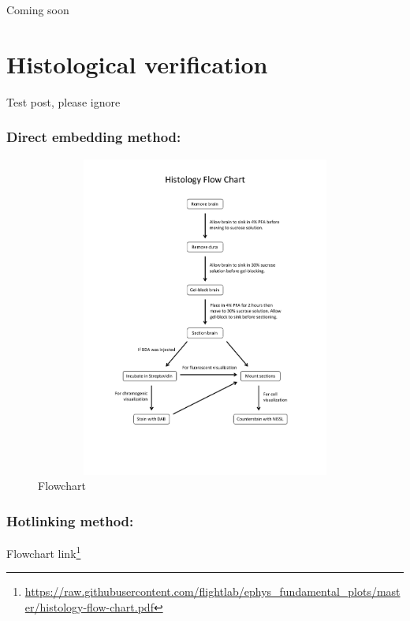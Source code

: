\documentclass[
]{book}
\DeclareRobustCommand{\href}[2]{#2\footnote{\url{#1}}}
\begin{document}
Coming soon

\hypertarget{histological-verification}{%
\chapter{Histological verification}\label{histological-verification}}

Test post, please ignore

\hypertarget{direct-embedding-method}{%
\subsection{Direct embedding method:}\label{direct-embedding-method}}

\begin{figure}
\centering
\includegraphics[width=1\textwidth,height=4.16667in]{./histology-flow-chart.pdf}
\caption{Flowchart}
\end{figure}

\hypertarget{hotlinking-method}{%
\subsection{Hotlinking method:}\label{hotlinking-method}}

\href{https://raw.githubusercontent.com/flightlab/ephys_fundamental_plots/master/histology-flow-chart.pdf}{Flowchart link}

  
\end{document}
